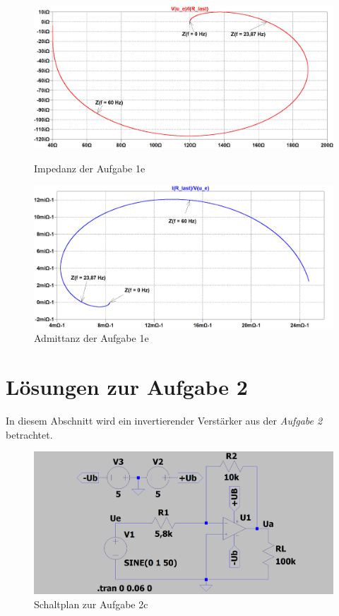 \documentclass[
	journal,
	a4paper,
]{IEEEtran}
\newcommand{\aufgabe}[1]{\emph{Aufgabe #1}}
\newcommand{\bildbreite}{0.95\columnwidth}
\begin{document}
	\begin{figure}
		\centering
		\includegraphics[width=\bildbreite]{Impedanz.png}
		\caption{Impedanz der Aufgabe 1e}
		\label{fig:1d:Impedanz}
		\includegraphics[width=\bildbreite]{Admittanz.png}
		\caption{Admittanz der Aufgabe 1e}
		\label{fig:1d:Admittanz}
	\end{figure}
	
\section{Lösungen zur Aufgabe 2}
In diesem Abschnitt wird ein invertierender Verstärker aus der \aufgabe{2} betrachtet.

\begin{figure}
	\centering
	\includegraphics[width=\bildbreite]{2cSchaltplan}
	\caption{Schaltplan zur Aufgabe 2c}
	\label{fig:2c:Schaltplan}
\end{figure}
\end{document}
